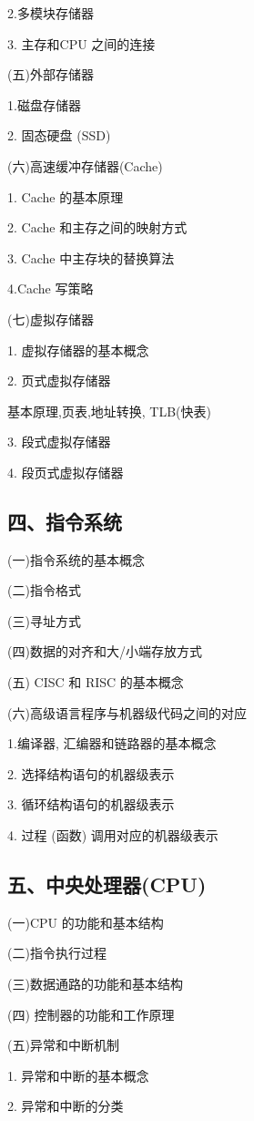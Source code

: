 \documentclass[10pt]{article}
\begin{document}
2.多模块存储器

3. 主存和CPU 之间的连接

{\color{red} (五)外部存储器

1.磁盘存储器

2. 固态硬盘 (SSD)}

(六)高速缓冲存储器(Cache)

1. Cache 的基本原理

2. Cache 和主存之间的映射方式

3. Cache 中主存块的替换算法

4.Cache 写策略

(七)虚拟存储器

1. 虚拟存储器的基本概念

2. 页式虚拟存储器

基本原理,页表,地址转换, TLB(快表)

3. 段式虚拟存储器

4. 段页式虚拟存储器

\subsection*{四、指令系统}

(一)指令系统的基本概念

(二)指令格式

(三)寻址方式

{\color{red} (四)数据的对齐和大/小端存放方式}

(五) CISC 和 RISC 的基本概念

{\color{red} (六)高级语言程序与机器级代码之间的对应

1.编译器, 汇编器和链路器的基本概念

2. 选择结构语句的机器级表示

3. 循环结构语句的机器级表示

4. 过程 (函数) 调用对应的机器级表示}

\subsection*{五、中央处理器(CPU)}

(一)CPU 的功能和基本结构

(二)指令执行过程

(三)数据通路的功能和基本结构

(四) 控制器的功能和工作原理

(五)异常和中断机制

1. 异常和中断的基本概念

2. 异常和中断的分类
\end{document}
